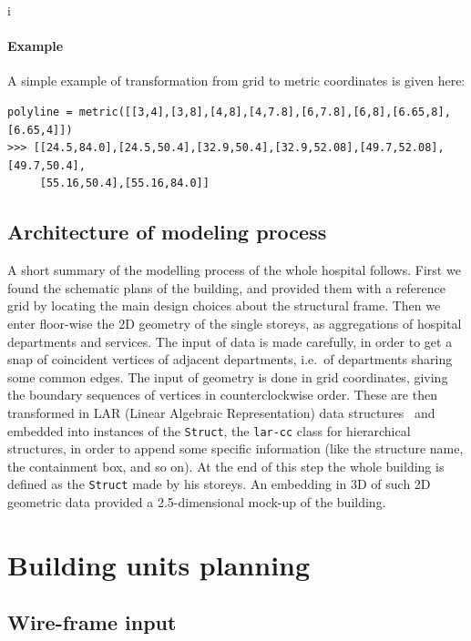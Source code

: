 i\documentclass[11pt,oneside]{article}    %
\begin{document}
\paragraph{Example} 
A simple example of transformation from grid to metric coordinates is given here:
{\small 
\begin{verbatim}
polyline = metric([[3,4],[3,8],[4,8],[4,7.8],[6,7.8],[6,8],[6.65,8],[6.65,4]])
>>> [[24.5,84.0],[24.5,50.4],[32.9,50.4],[32.9,52.08],[49.7,52.08],[49.7,50.4],
     [55.16,50.4],[55.16,84.0]]
\end{verbatim}}



\subsection{Architecture of modeling process}

A short summary of the  modelling process of the whole hospital follows. First we found the schematic plans of the building,
and provided them with a reference grid by locating the main design choices about the structural frame.
Then we enter floor-wise the 2D geometry of the single storeys, as aggregations of hospital departments and services.
The input of data is made carefully, in order to get a snap of coincident vertices of adjacent departments, i.e.~of departments sharing some common edges. The input of geometry is done in grid coordinates, giving the boundary sequences of vertices in counterclockwise order. These are then transformed in LAR (Linear Algebraic Representation) data structures~\cite{Dicarlo:2014:TNL:2543138.2543294} and embedded into instances of the \texttt{Struct}, the \texttt{lar-cc} class for  hierarchical structures, in order to append some specific information (like the structure name, the containment box, and so on). At the end of this step the whole building is defined as the \texttt{Struct} made by his storeys. An embedding in 3D of such 2D geometric data provided a 2.5-dimensional mock-up of the building.


\section{Building units planning}

\subsection{Wire-frame input}
\end{document}
